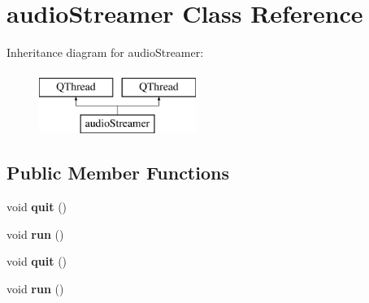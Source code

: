 \hypertarget{classaudioStreamer}{\section{audio\-Streamer Class Reference}
\label{classaudioStreamer}
}
Inheritance diagram for audio\-Streamer\-:\begin{figure}[H]
\begin{center}
\leavevmode
\includegraphics[height=2.000000cm]{classaudioStreamer}
\end{center}
\end{figure}
\subsection*{Public Member Functions}
\begin{DoxyCompactItemize}
\item 
\hypertarget{classaudioStreamer_aa236fda0774b738734c2c62b92a912c3}{void {\bfseries quit} ()}\label{classaudioStreamer_aa236fda0774b738734c2c62b92a912c3}

\item 
\hypertarget{classaudioStreamer_a7488bec15fe99d666b66dd5fa45df74e}{void {\bfseries run} ()}\label{classaudioStreamer_a7488bec15fe99d666b66dd5fa45df74e}

\item 
\hypertarget{classaudioStreamer_aa236fda0774b738734c2c62b92a912c3}{void {\bfseries quit} ()}\label{classaudioStreamer_aa236fda0774b738734c2c62b92a912c3}

\item 
\hypertarget{classaudioStreamer_a7488bec15fe99d666b66dd5fa45df74e}{void {\bfseries run} ()}\label{classaudioStreamer_a7488bec15fe99d666b66dd5fa45df74e}

\end{DoxyCompactItemize}
